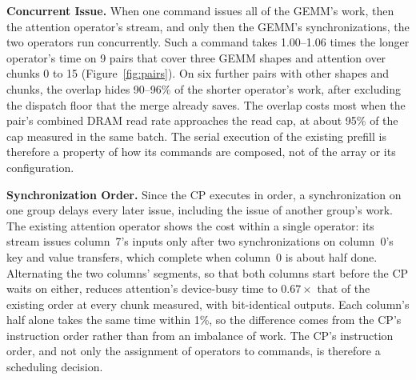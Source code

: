 \textbf{Concurrent Issue.}
When one command issues all of the GEMM's work, then the attention operator's stream, and only then the GEMM's synchronizations, the two operators run concurrently.
Such a command takes 1.00--1.06 times the longer operator's time on 9 pairs that cover three GEMM shapes and attention over chunks 0 to 15 (Figure~\ref{fig:pairs}).
On six further pairs with other shapes and chunks, the overlap hides 90--96\% of the shorter operator's work, after excluding the dispatch floor that the merge already saves.
The overlap costs most when the pair's combined DRAM read rate approaches the read cap, at about 95\% of the cap measured in the same batch.
The serial execution of the existing prefill is therefore a property of how its commands are composed, not of the array or its configuration.

\textbf{Synchronization Order.}
Since the CP executes in order, a synchronization on one group delays every later issue, including the issue of another group's work.
The existing attention operator shows the cost within a single operator: its stream issues column~7's inputs only after two synchronizations on column~0's key and value transfers, which complete when column~0 is about half done.
Alternating the two columns' segments, so that both columns start before the CP waits on either, reduces attention's device-busy time to $0.67\times$ that of the existing order at every chunk measured, with bit-identical outputs.
Each column's half alone takes the same time within 1\%, so the difference comes from the CP's instruction order rather than from an imbalance of work.
The CP's instruction order, and not only the assignment of operators to commands, is therefore a scheduling decision.

